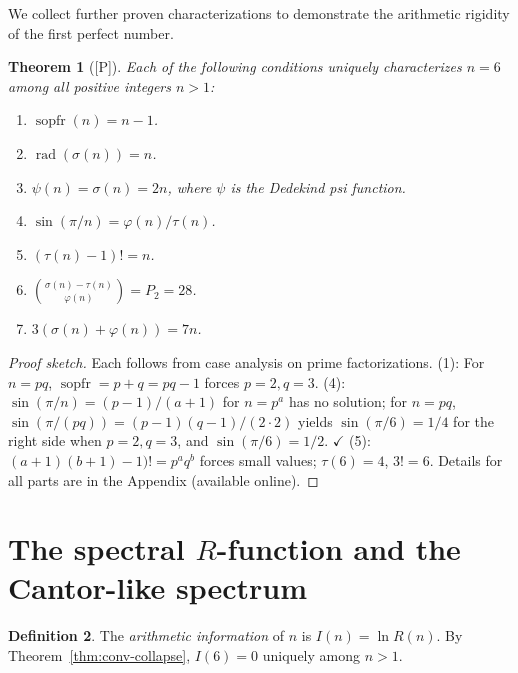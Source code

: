 \documentclass[11pt,letterpaper]{article}
\newtheorem{theorem}{Theorem}[section]
\theoremstyle{definition}
\newtheorem{definition}[theorem]{Definition}
\theoremstyle{remark}
\newcommand{\proven}{\textsf{[P]}}
\begin{document}
We collect further proven characterizations to demonstrate the arithmetic 
rigidity of the first perfect number.

\begin{theorem}[\proven]\label{thm:additional}
Each of the following conditions uniquely characterizes $n = 6$ 
among all positive integers $n > 1$:
\begin{enumerate}
\item $\operatorname{sopfr}(n) = n - 1$. 
\item $\operatorname{rad}(\sigma(n)) = n$.
\item $\psi(n) = \sigma(n) = 2n$, where $\psi$ is the Dedekind psi function.
\item $\sin(\pi/n) = \varphi(n)/\tau(n)$.
\item $(\tau(n)-1)! = n$.
\item $\binom{\sigma(n)-\tau(n)}{\varphi(n)} = P_2 = 28$.
\item $3(\sigma(n)+\varphi(n)) = 7n$.
\end{enumerate}
\end{theorem}

\begin{proof}[Proof sketch]
Each follows from case analysis on prime factorizations.
(1): For $n = pq$, $\operatorname{sopfr}=p+q = pq-1$ forces $p=2, q=3$.
(4): $\sin(\pi/n) = (p-1)/(a+1)$ for $n=p^a$ has no solution; for $n=pq$,
$\sin(\pi/(pq)) = (p-1)(q-1)/(2\cdot 2)$ yields $\sin(\pi/6)=1/4$ for
the right side when $p=2,q=3$, and $\sin(\pi/6)=1/2$. $\checkmark$
(5): $(a+1)(b+1)-1)! = p^a q^b$ forces small values; $\tau(6)=4$, $3!=6$.
Details for all parts are in the Appendix (available online).
\end{proof}

\section{The spectral $R$-function and the Cantor-like spectrum}
\label{sec:spectrum}

\begin{definition}
The \emph{arithmetic information} of $n$ is $I(n) = \ln R(n)$. 
By Theorem~\ref{thm:conv-collapse}, $I(6) = 0$ uniquely among $n > 1$.
\end{definition}
\end{document}
